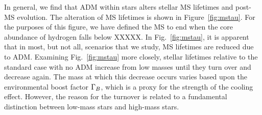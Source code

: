 \documentclass[useAMS,usenatbib]{mnras}
\begin{document}

  In general, we find that ADM within stars alters stellar MS lifetimes and post-MS evolution. The alteration
  of MS lifetimes is shown in Figure~\ref{fig:mstau}. For the purposes of this figure, we have defined the
  MS to end when the core abundance of hydrogen falls below XXXXX. In Fig.~\ref{fig:mstau},
  it is apparent that in most, but not all, scenarios that we study, MS lifetimes are reduced due to ADM.
  Examining Fig.~\ref{fig:mstau} more closely, stellar lifetimes relative to the standard case with no
  ADM increase from low masses until they turn over and decrease again. The mass at which this decrease
  occurs varies based upon the environmental boost factor $\Gamma_B$, which is a proxy for the strength of the
  cooling effect. However, the reason for the turnover is related to a fundamental distinction between
  low-mass stars and high-mass stars.

\end{document}
